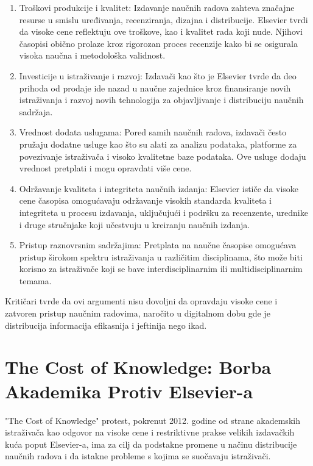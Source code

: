 \documentclass{article}
\begin{document}
\begin{enumerate}
    \item Troškovi produkcije i kvalitet: Izdavanje naučnih radova zahteva značajne resurse u smislu uređivanja, recenziranja, dizajna i distribucije. Elsevier tvrdi da visoke cene reflektuju ove troškove, kao i kvalitet rada koji nude. Njihovi časopisi obično prolaze kroz rigorozan proces recenzije kako bi se osigurala visoka naučna i metodološka validnost.
    \item Investicije u istraživanje i razvoj: Izdavači kao što je Elsevier tvrde da deo prihoda od prodaje ide nazad u naučne zajednice kroz finansiranje novih istraživanja i razvoj novih tehnologija za objavljivanje i distribuciju naučnih sadržaja.
    \item Vrednost dodata uslugama: Pored samih naučnih radova, izdavači često pružaju dodatne usluge kao što su alati za analizu podataka, platforme za povezivanje istraživača i visoko kvalitetne baze podataka. Ove usluge dodaju vrednost pretplati i mogu opravdati više cene.
    \item Održavanje kvaliteta i integriteta naučnih izdanja: Elsevier ističe da visoke cene časopisa omogućavaju održavanje visokih standarda kvaliteta i integriteta u procesu izdavanja, uključujući i podršku za recenzente, urednike i druge stručnjake koji učestvuju u kreiranju naučnih izdanja.
    \item Pristup raznovrsnim sadržajima: Pretplata na naučne časopise omogućava pristup širokom spektru istraživanja u različitim disciplinama, što može biti korisno za istraživače koji se bave interdisciplinarnim ili multidisciplinarnim temama.
\end{enumerate}

Kritičari tvrde da ovi argumenti nisu dovoljni da opravdaju visoke cene i zatvoren pristup naučnim radovima, naročito u digitalnom dobu gde je distribucija informacija efikasnija i jeftinija nego ikad.


\section{The Cost of Knowledge: Borba Akademika Protiv Elsevier-a}

"The Cost of Knowledge" protest, pokrenut 2012. godine od strane akademskih istraživača kao odgovor na visoke cene i restriktivne prakse velikih izdavačkih kuća poput Elsevier-a, ima za cilj da podstakne promene u načinu distribucije naučnih radova i da istakne probleme s kojima se suočavaju istraživači.
\end{document}

